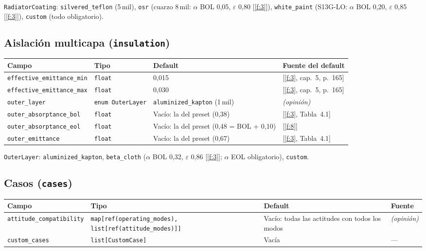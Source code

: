 \documentclass[11pt,a4paper]{article}
\newcommand{\code}[1]{\texttt{#1}}
\newcommand{\op}[1]{\textcolor{opinion}{\textit{(#1)}}}
\newcommand{\f}[1]{\ref{f:#1}}
\begin{document}
\code{RadiatorCoating}: \code{silvered\_teflon} (5\,mil), \code{osr} (cuarzo 8\,mil: $\alpha$ BOL 0,05, $\varepsilon$ 0,80 [\f{3}]), \code{white\_paint} (S13G-LO: $\alpha$ BOL 0,20, $\varepsilon$ 0,85 [\f{3}]), \code{custom} (todo obligatorio).

\subsection{Aislación multicapa (\code{insulation})}

{\small
\begin{xltabular}{\textwidth}{@{}P{4.4cm}P{2.6cm}LP{2.8cm}@{}}
\toprule
\textbf{Campo} & \textbf{Tipo} & \textbf{Default} & \textbf{Fuente del default} \\
\midrule
\endhead
\code{effective\_emittance\_min} & \code{float} & 0,015 & [\f{3}, cap.~5, p.~165] \\
\code{effective\_emittance\_max} & \code{float} & 0,030 & [\f{3}, cap.~5, p.~165] \\
\code{outer\_layer} & \code{enum OuterLayer} & \code{aluminized\_kapton} (1\,mil) & \op{opinión} \\
\code{outer\_absorptance\_bol} & \code{float} & Vacío: la del preset (0,38) & [\f{3}, Tabla~4.1] \\
\code{outer\_absorptance\_eol} & \code{float} & Vacío: la del preset (0,48 = BOL + 0,10) & [\f{8}] \\
\code{outer\_emittance} & \code{float} & Vacío: la del preset (0,67) & [\f{3}, Tabla~4.1] \\
\bottomrule
\end{xltabular}
}

\code{OuterLayer}: \code{aluminized\_kapton}, \code{beta\_cloth} ($\alpha$ BOL 0,32, $\varepsilon$ 0,86 [\f{3}]; $\alpha$ EOL obligatorio), \code{custom}.

\subsection{Casos (\code{cases})}

{\small
\begin{xltabular}{\textwidth}{@{}P{3.6cm}P{4.6cm}LP{2cm}@{}}
\toprule
\textbf{Campo} & \textbf{Tipo} & \textbf{Default} & \textbf{Fuente} \\
\midrule
\endhead
\code{attitude\_compatibility} & \code{map[ref(operating\_modes), list[ref(attitude\_modes)]]} & Vacío: todas las actitudes con todos los modos & \op{opinión} \\
\code{custom\_cases} & \code{list[CustomCase]} & Vacía & --- \\
\bottomrule
\end{xltabular}
}
\end{document}
